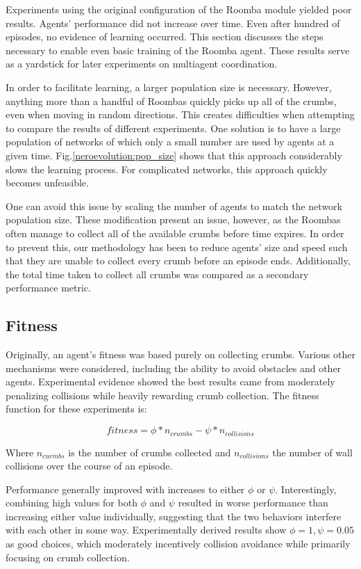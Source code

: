 \documentclass[conference]{IEEEtran}
\begin{document}
Experiments using the original configuration of the Roomba module yielded poor results. Agents' performance did not increase over time.  Even after hundred of episodes, no evidence of learning occurred. This section discusses the steps necessary to enable even basic training of the Roomba agent. These results serve as a yardstick for later experiments on multiagent coordination.

In order to facilitate learning, a larger population size is necessary. 
However, anything more than a handful of Roombas quickly picks up all of the crumbs, even when moving in random directions. This creates difficulties when attempting to compare the results of different experiments.
One solution is to have a large population of networks of which only a small number are used by agents at a given time. Fig.\ref{neroevolution:pop_size} shows that this approach considerably slows the learning process. For complicated networks, this approach quickly becomes unfeasible.

One can avoid this issue by scaling the number of agents to match the network population size. These modification present an issue, however, as the Roombas often manage to collect all of the available crumbs before time expires. In order to prevent this, our methodology has been to reduce agents' size and speed such that they are unable to collect every crumb before an episode ends. Additionally, the total time taken to collect all crumbs was compared as a secondary performance metric.


\subsection{Fitness}
Originally, an agent's fitness was based purely on collecting crumbs. Various other mechanisms were considered, including the ability to avoid obstacles and other agents. Experimental evidence showed the best results came from moderately penalizing collisions while heavily rewarding crumb collection. The fitness function for these experiments is:


\[ fitness = \phi * n_{crumbs} - \psi * n_{collisions}\]

Where $n_{curmbs}$ is the number of crumbs collected and $n_{collisions}$ the number of wall collisions over the course of an episode. 
 
Performance generally improved with increases to either $\phi$ or $\psi$.
Interestingly, combining high values for both $\phi$ and $\psi$ resulted in worse performance than increasing either value individually, suggesting that the two behaviors interfere with each other in some way. 
Experimentally derived results show $\phi = 1, \psi = 0.05$ as good choices, which moderately incentively collision avoidance while primarily focusing on crumb collection. 
\end{document}
